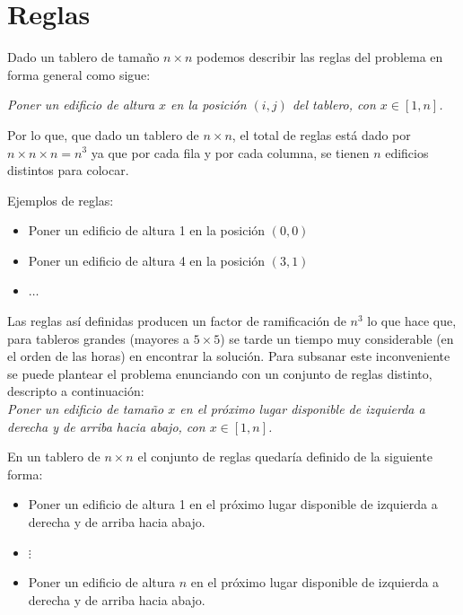 \documentclass[%
    final,
    reprint,
    notitlepage,
    narroweqnarray,
    inline,
    twoside,
    invited
    ]{ieee}
\begin{document}
\section{Reglas}

\par Dado un tablero de tamaño $n\times n$ podemos describir las reglas del problema en forma general como sigue:

\emph{Poner un edificio de altura $x$ en la posición $(i,j)$ del tablero, con $x \in [1, n]$.}

\par Por lo que, que dado un tablero de $n\times n$, el total de reglas está dado por $n \times {n \times n} = n^3$ ya que por cada fila y por cada columna, se tienen $n$ edificios distintos para colocar. 
\par Ejemplos de reglas:
\begin{itemize}
\item Poner un edificio de altura 1 en la posición $(0,0)$
\item Poner un edificio de altura 4 en la posición $(3,1)$
\item $\ldots$

\end{itemize}

\par Las reglas así definidas producen un factor de ramificación de $n^3$ lo que hace que, para tableros grandes (mayores a $5\times5$) se tarde un tiempo muy considerable (en el orden de las horas) en encontrar la solución. Para subsanar este inconveniente se puede plantear el problema enunciando con un conjunto de reglas distinto, descripto a continuación:\\

\emph{Poner un edificio de tamaño $x$ en el próximo lugar disponible de izquierda a derecha y de arriba hacia abajo, con $x \in [1, n]$.}\\

\par En un tablero de $n\times n$ el conjunto de reglas quedaría definido de la siguiente forma:\\

\begin{itemize}
\item Poner un edificio de altura 1 en el próximo lugar disponible de izquierda a derecha y de arriba hacia abajo.
\item $\vdots$
\item Poner un edificio de altura $n$ en el próximo lugar disponible de izquierda a derecha y de arriba hacia abajo.
\end{itemize}
\end{document}
